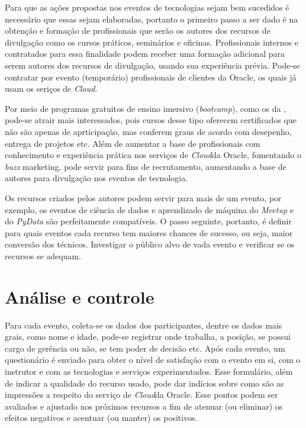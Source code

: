 \documentclass[a4paper]{article}
\newcommand{\C}{\emph{Cloud}}
\begin{document}
Para que as ações propostas nos eventos de tecnologias sejam bem sucedidos é necessário que essas sejam elaboradas, portanto o primeiro passo a ser dado é na obtenção e formação de profissionais que serão os autores dos recursos de divulgação como os cursos práticos, seminários e oficinas. Profissionais internos e contratados para essa finalidade podem receber uma formação adicional para serem autores dos recursos de divulgação, usando sua experiência prévia. Pode-se contratar por evento (temporário) profissionais de clientes da Oracle, os quais já usam os seriços de \C. 

Por meio de programas gratuitos de ensino imersivo (\emph{bootcamp}), como os da , pode-se atrair mais interessados, pois cursos desse tipo oferecem certificados que não são apenas de aprticipação, mas conferem graus de acordo com desepenho, entrega de projetos etc. Além de aumentar a base de profissionais com conhecimento e experiência prática nos serviços de \C da Oracle, fomentando o \emph{buzz} marketing, pode servir para fins de recrutamento, aumentando a base de autores para divulgação nos eventos de tecnologia.

Os recursos criados pelos autores podem servir para mais de um evento, por exemplo, os eventos de ciência de dados e aprendizado de máquina do \emph{Meetup} e do \emph{PyData} são perfeitamente compatíveis. O passo seguinte, portanto, é definir para quais eventos cada recurso tem maiores chances de sucesso, ou seja, maior conversão dos técnicos. Investigar o público alvo de vada evento e verificar se os recursos se adequam.

\section{Análise e controle}

Para cada evento, coleta-se os dados dos participantes, dentre os dados mais grais, como nome e idade, pode-se registrar onde trabalha, a posição, se possui cargo de gerência ou não, se tem poder de decisão etc. Após cada evento, um questionário é enviado para obter o nível de satisfação com o evento em si, com o instrutor e com as tecnologias e serviços experimentados. Esse formulário, além de indicar a qualidade do recurso usado, pode dar indícios sobre como são as impressões a respeito do serviço de \C da Oracle. Esse pontos podem ser avaliados e ajustado nos próximos recursos a fim de atenuar (ou eliminar) os efeitos negativos e acentuar (ou manter) os positivos.
\end{document}
